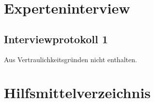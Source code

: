 \appendix

\section{Experteninterview} \label{app:interview}





%   
%   


\subsection{Interviewprotokoll 1} \label{app:interview1}
Aus Vertraulichkeitsgründen nicht enthalten.

\newpage
\section{Hilfsmittelverzeichnis}

